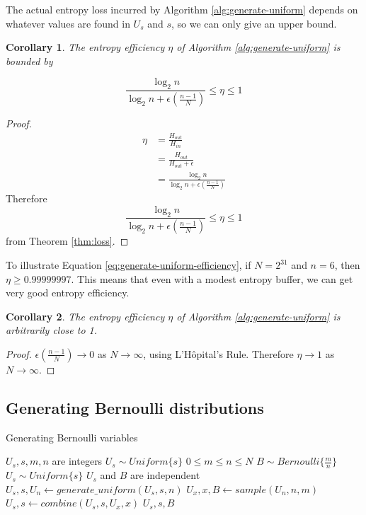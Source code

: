 \documentclass[12pt]{article}
\newtheorem{corollary}{Corollary}
\begin{document}
The actual entropy loss incurred by Algorithm \ref{alg:generate-uniform} depends on whatever values are found in $U_s$ and $s$, so we can only give an upper bound.

\begin{corollary}
The entropy efficiency $\eta$ of Algorithm \ref{alg:generate-uniform} is bounded by

\begin{equation}
\frac{\log_2n}{\log_2n + \epsilon(\frac{n-1}{N})} \le \eta \le 1
\label{eq:generate-uniform-efficiency}
\end{equation}
\end{corollary}

\begin{proof}
\begin{align}
    \eta & = \frac{H_{out}}{H_{in}} \\
         & = \frac{H_{out}}{H_{out}+\epsilon} \\
         & = \frac{\log_2n}{\log_2n + \epsilon(\frac{n-1}{N})}
\end{align}
Therefore 
\begin{equation}
\frac{\log_2n}{\log_2n + \epsilon(\frac{n-1}{N})} \le \eta \le 1
\end{equation}
from Theorem \ref{thm:loss}.
\end{proof}

To illustrate Equation \ref{eq:generate-uniform-efficiency}, if $N=2^{31}$ and $n=6$, then $\eta \ge 0.99999997$. This means that even with a modest entropy buffer, we can get very good entropy efficiency.

\begin{corollary}
The entropy efficiency $\eta$ of Algorithm \ref{alg:generate-uniform} is arbitrarily close to 1.
\end{corollary}

\begin{proof}
$\epsilon(\frac{n-1}{N}) \rightarrow 0$ as $N \rightarrow \infty$, using L'H\^opital's Rule. Therefore $\eta \rightarrow 1$ as $N \rightarrow \infty$.
\end{proof}



\subsection{Generating Bernoulli distributions}


\begin{algorithm}
\caption{Generating Bernoulli variables}
\label{alg:generate-bernoulli}
\begin{algorithmic}[1]
\Require $U_s, s, m, n$ are integers
\Require $U_s \sim Uniform\{s\}$
\Require $0 \le m \le n\le N$
\Ensure $B \sim Bernoulli\{\frac{m}{n}\}$
\Ensure $U_s \sim Uniform\{s\}$
\Ensure $U_s$ and $B$ are independent
  \State $U_s, s, U_n \gets generate\_uniform(U_s, s, n)$
  \State $U_x, x, B \gets sample(U_n, n, m)$
  \State $U_s, s \gets combine(U_s, s, U_x, x)$
  \State \Return $U_s, s, B$
\EndProcedure
\end{algorithmic}
\end{algorithm}
\end{document}
